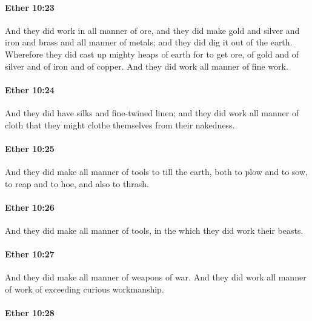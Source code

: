 		\paragraph{Ether 10:23} %
			\label{ETHER-10-23}

			And they did work in all manner of ore,
			and they did make gold and silver and iron and brass and all manner of metals;
			and they did dig it out of the earth.
			Wherefore they did cast up mighty heaps of earth for to get ore,
			of gold and of silver and of iron and of copper.
			And they did work all manner of fine work.

		\paragraph{Ether 10:24} %
			\label{ETHER-10-24}

			And they did have silks and fine-twined linen;
			and they did work all manner of cloth
			that they might clothe themselves from their nakedness.

		\paragraph{Ether 10:25} %
			\label{ETHER-10-25}

			And they did make all manner of tools to till the earth,
			both to plow and to sow,
			to reap and to hoe, and also to thrash.

		\paragraph{Ether 10:26} %
			\label{ETHER-10-26}

			And they did make all manner of tools,
			in the which they did work their beasts.

		\paragraph{Ether 10:27} %
			\label{ETHER-10-27}

			And they did make all manner of weapons of war.
			And they did work all manner of work of exceeding curious workmanship.

		\paragraph{Ether 10:28} %
			\label{ETHER-10-28}

